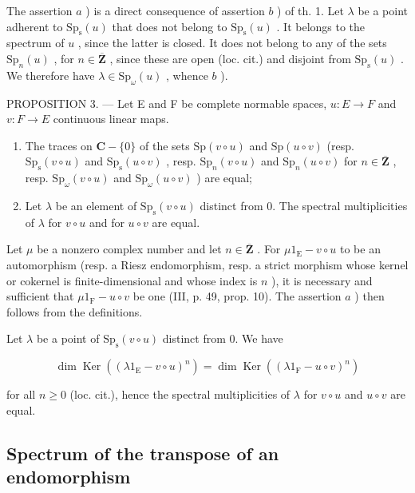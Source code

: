 The assertion \(a\) ) is a direct consequence of assertion \(b\) ) of th. 1. Let \(\lambda\) be a point adherent to \(\mathrm{Sp}_{\mathrm{s}}(u)\) that does not belong to \(\mathrm{Sp}_{\mathrm{s}}(u)\) . It belongs to the spectrum of \(u\) , since the latter is closed. It does not belong to any of the sets \(\mathrm{Sp}_{n}(u)\) , for \(n \in \overline{\mathbf{Z}}\) , since these are open (loc. cit.) and disjoint from \(\mathrm{Sp}_{\mathrm{s}}(u)\) . We therefore have \(\lambda \in \mathrm{Sp}_{\omega}(u)\) , whence \(b\) ).

PROPOSITION 3. --- Let E and F be complete normable spaces, \(u\colon E\to F\) and \(v\colon F\to E\) continuous linear maps.

\begin{enumerate}
\def\labelenumi{\alph{enumi})}
\item
  The traces on \(\mathbf{C} - \{0\}\) of the sets \(\mathrm{Sp}(v \circ u)\) and \(\mathrm{Sp}(u \circ v)\) (resp. \(\mathrm{Sp}_{\mathrm{s}}(v \circ u)\) and \(\mathrm{Sp}_{\mathrm{s}}(u \circ v)\) , resp. \(\mathrm{Sp}_{n}(v \circ u)\) and \(\mathrm{Sp}_{n}(u \circ v)\) for \(n \in \overline{\mathbf{Z}}\) , resp. \(\mathrm{Sp}_{\omega}(v \circ u)\) and \(\mathrm{Sp}_{\omega}(u \circ v)\) ) are equal;
\item
  Let \(\lambda\) be an element of \(\mathrm{Sp}_{\mathrm{s}}(v \circ u)\) distinct from 0. The spectral multiplicities of \(\lambda\) for \(v \circ u\) and for \(u \circ v\) are equal.
\end{enumerate}

Let \(\mu\) be a nonzero complex number and let \(n \in \overline{\mathbf{Z}}\) . For \(\mu 1_{\mathrm{E}} - v \circ u\) to be an automorphism (resp. a Riesz endomorphism, resp. a strict morphism whose kernel or cokernel is finite-dimensional and whose index is \(n\) ), it is necessary and sufficient that \(\mu 1_{\mathrm{F}} - u \circ v\) be one (III, p. 49, prop. 10). The assertion \(a\) ) then follows from the definitions.

Let \(\lambda\) be a point of \(\mathrm{Sp}_{\mathrm{s}}(v \circ u)\) distinct from 0. We have

\[
\dim \operatorname{Ker} ((\lambda 1 _ {\mathrm{E}} - v \circ u) ^ {n}) = \dim \operatorname{Ker} ((\lambda 1 _ {\mathrm{F}} - u \circ v) ^ {n})
\]

for all \(n \geqslant 0\) (loc. cit.), hence the spectral multiplicities of \(\lambda\) for \(v \circ u\) and \(u \circ v\) are equal.

\subsection{Spectrum of the transpose of an endomorphism}

